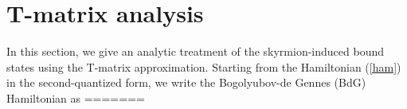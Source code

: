 \documentclass[twocolumn,showpacs,floatfix,nofootinbib,longbibliography]{revtex4-1}
\begin{document}
%



\appendix

\section{T-matrix analysis} \label{sec:appendixTMatrix}
In this section, we give an analytic treatment of the skyrmion-induced bound states using the T-matrix approximation. Starting from the Hamiltonian (\ref{ham}) in the second-quantized form, we write the Bogolyubov-de Gennes (BdG) Hamiltonian as
=======
\end{document}
